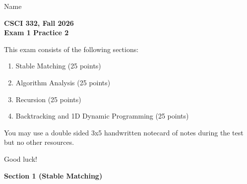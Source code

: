 \documentclass[11pt]{article}
\begin{document}
\noindent Name \underline{\hspace{12cm}}\\

\begin{center}
\Large\textbf{CSCI 332, Fall 2026}\\
\LARGE\textbf{Exam 1 Practice 2}
\end{center}

\noindent This exam consists of the following sections:
\begin{enumerate}
    \item Stable Matching (25 points)
    \item Algorithm Analysis (25 points)
    \item Recursion (25 points)
    \item Backtracking and 1D Dynamic Programming (25 points)
\end{enumerate}

You may use a double sided 3x5 handwritten notecard of notes during the test but no other resources.

Good luck!

\newpage

\begin{center}
\LARGE\textbf{Section 1 (Stable Matching)\\}%
\end{center}
\end{document}
